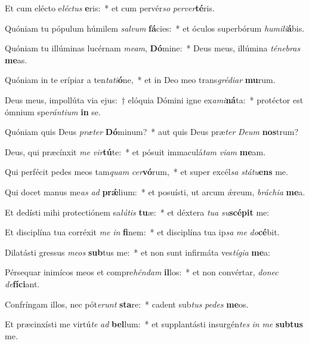 \item Et cum elécto e\textit{léc}\textit{tus} \textbf{e}ris:~* et cum pervér\textit{so} \textit{per}\textit{ver}\textbf{té}ris.
\item Quóniam tu pópulum húmilem \textit{sal}\textit{vum} \textbf{fá}cies:~* et óculos superbórum \textit{hu}\textit{mi}\textit{li}\textbf{á}bis.
\item Quóniam tu illúminas lucérnam \textit{me}\textit{am}, \textbf{Dó}mine:~* Deus meus, illúmina \textit{té}\textit{ne}\textit{bras} \textbf{me}as.
\item Quóniam in te erípiar a ten\textit{ta}\textit{ti}\textbf{ó}ne,~* et in Deo meo trans\textit{gré}\textit{di}\textit{ar} \textbf{mu}rum.
\item Deus meus, impollúta via ejus:~† elóquia Dómini igne ex\textit{a}\textit{mi}\textbf{ná}ta:~* protéctor est ómnium spe\textit{rán}\textit{ti}\textit{um} \textbf{in} se.
\item Quóniam quis Deus \textit{præ}\textit{ter} \textbf{Dó}minum?~* aut quis Deus præ\textit{ter} \textit{De}\textit{um} \textbf{nos}trum?
\item Deus, qui præcínxit \textit{me} \textit{vir}\textbf{tú}te:~* et pósuit immaculá\textit{tam} \textit{vi}\textit{am} \textbf{me}am.
\item Qui perfécit pedes meos tam\textit{quam} \textit{cer}\textbf{vó}rum,~* et super excél\textit{sa} \textit{stá}\textit{tu}\textbf{ens} me.
\item Qui docet manus me\textit{as} \textit{ad} \textbf{prǽ}lium:~* et posuísti, ut arcum ǽreum, \textit{brá}\textit{chi}\textit{a} \textbf{me}a.
\item Et dedísti mihi protectiónem sa\textit{lú}\textit{tis} \textbf{tu}æ:~* et déxtera \textit{tu}\textit{a} \textit{su}\textbf{scé}\textbf{pit} me:
\item Et disciplína tua corréxit \textit{me} \textit{in} \textbf{fi}nem:~* et disciplína tua ip\textit{sa} \textit{me} \textit{do}\textbf{cé}bit.
\item Dilatásti gressus \textit{me}\textit{os} \textbf{sub}tus me:~* et non sunt infirmáta ves\textit{tí}\textit{gi}\textit{a} \textbf{me}a:
\item Pérsequar inimícos meos et compre\textit{hén}\textit{dam} \textbf{il}los:~* et non convértar, \textit{do}\textit{nec} \textit{de}\textbf{fí}\textbf{ci}ant.
\item Confríngam illos, nec pót\textit{e}\textit{runt} \textbf{sta}re:~* cadent sub\textit{tus} \textit{pe}\textit{des} \textbf{me}os.
\item Et præcinxísti me virtú\textit{te} \textit{ad} \textbf{bel}lum:~* et supplantásti insurgén\textit{tes} \textit{in} \textit{me} \textbf{sub}\textbf{tus} me.
